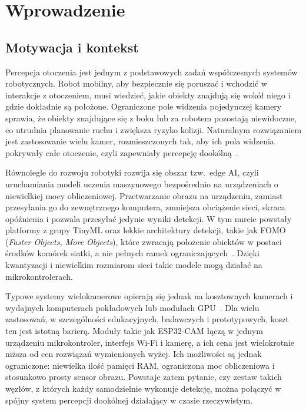 \chapter{Wprowadzenie}
\label{cha:wprowadzenie}


\section{Motywacja i kontekst}
\label{sec:motywacja}

Percepcja otoczenia jest jednym z podstawowych zadań współczesnych systemów robotycznych. Robot mobilny, aby bezpiecznie się poruszać i wchodzić w interakcje z otoczeniem, musi wiedzieć, jakie obiekty znajdują się wokół niego i gdzie dokładnie są położone. Ograniczone pole widzenia pojedynczej kamery sprawia, że obiekty znajdujące się z boku lub za robotem pozostają niewidoczne, co utrudnia planowanie ruchu i zwiększa ryzyko kolizji. Naturalnym rozwiązaniem jest zastosowanie wielu kamer, rozmieszczonych tak, aby ich pola widzenia pokrywały całe otoczenie, czyli zapewniały percepcję dookólną~\cite{TODO_percepcja_dookolna}.

Równolegle do rozwoju robotyki rozwija się obszar tzw.\ edge AI, czyli uruchamiania modeli uczenia maszynowego bezpośrednio na urządzeniach o niewielkiej mocy obliczeniowej. Przetwarzanie obrazu na urządzeniu, zamiast przesyłania go do zewnętrznego komputera, zmniejsza obciążenie sieci, skraca opóźnienia i pozwala przesyłać jedynie wyniki detekcji. W tym nurcie powstały platformy z grupy TinyML oraz lekkie architektury detekcji, takie jak FOMO (\emph{Faster Objects, More Objects}), które zwracają położenie obiektów w postaci środków komórek siatki, a nie pełnych ramek ograniczających~\cite{TODO_tinyml, TODO_fomo}. Dzięki kwantyzacji i niewielkim rozmiarom sieci takie modele mogą działać na mikrokontrolerach.

Typowe systemy wielokamerowe opierają się jednak na kosztownych kamerach i wydajnych komputerach pokładowych lub modułach GPU~\cite{TODO_systemy_wielokamerowe}. Dla wielu zastosowań, w szczególności edukacyjnych, badawczych i prototypowych, koszt ten jest istotną barierą. Moduły takie jak ESP32-CAM łączą w jednym urządzeniu mikrokontroler, interfejs Wi-Fi i kamerę, a ich cena jest wielokrotnie niższa od cen rozwiązań wymienionych wyżej. Ich możliwości są jednak ograniczone: niewielka ilość pamięci RAM, ograniczona moc obliczeniowa i stosunkowo prosty sensor obrazu. Powstaje zatem pytanie, czy zestaw takich węzłów, z których każdy samodzielnie wykonuje detekcję, można połączyć w spójny system percepcji dookólnej działający w czasie rzeczywistym.


